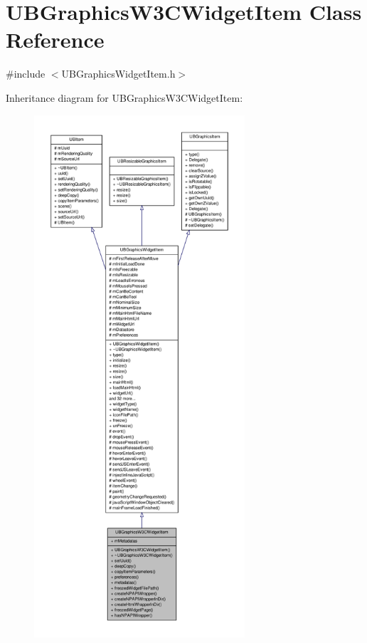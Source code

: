 \hypertarget{class_u_b_graphics_w3_c_widget_item}{\section{U\-B\-Graphics\-W3\-C\-Widget\-Item Class Reference}
\label{d7/da7/class_u_b_graphics_w3_c_widget_item}
}


{\ttfamily \#include $<$U\-B\-Graphics\-Widget\-Item.\-h$>$}



Inheritance diagram for U\-B\-Graphics\-W3\-C\-Widget\-Item\-:
\nopagebreak
\begin{figure}[H]
\begin{center}
\leavevmode
\includegraphics[height=550pt]{d1/d57/class_u_b_graphics_w3_c_widget_item__inherit__graph}
\end{center}
\end{figure}


